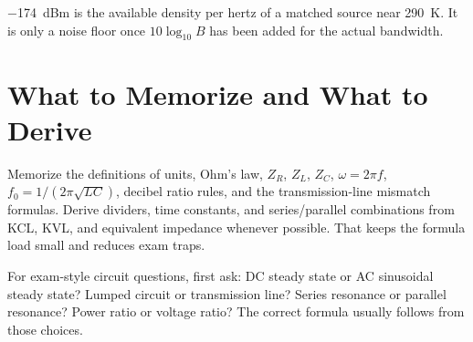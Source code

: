 \begin{mistakebox}
\SI{-174}{dBm} is the available density per hertz of a matched source near
\SI{290}{\kelvin}. It is only a noise floor once \(10\log_{10}B\) has been added
for the actual bandwidth.
\end{mistakebox}

\section{What to Memorize and What to Derive}
Memorize the definitions of units, Ohm's law, \(Z_R\), \(Z_L\), \(Z_C\),
\(\omega=2\pi f\), \(f_0=1/(2\pi\sqrt{LC})\), decibel ratio rules, and the
transmission-line mismatch formulas. Derive dividers, time constants, and
series/parallel combinations from KCL, KVL, and equivalent impedance whenever
possible. That keeps the formula load small and reduces exam traps.

\begin{exambox}
For exam-style circuit questions, first ask: DC steady state or AC sinusoidal
steady state? Lumped circuit or transmission line? Series resonance or parallel
resonance? Power ratio or voltage ratio? The correct formula usually follows
from those choices.
\end{exambox}
